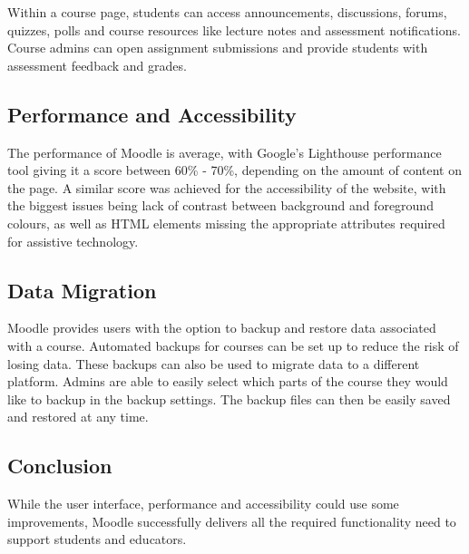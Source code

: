 Within a course page, students can access announcements, discussions, forums, quizzes, polls and course resources like lecture notes and assessment notifications.
Course admins can open assignment submissions and provide students with assessment feedback and grades.

\subsection{Performance and Accessibility}
The performance of Moodle is average, with Google's Lighthouse performance tool giving it a score between 60\% - 70\%, depending on the amount of content on the page.
A similar score was achieved for the accessibility of the website, with the biggest issues being lack of contrast between background and foreground colours, as well as HTML elements missing the appropriate attributes required for assistive technology.

\subsection{Data Migration}
Moodle provides users with the option to backup and restore data associated with a course.
Automated backups for courses can be set up to reduce the risk of losing data.
These backups can also be used to migrate data to a different platform.
Admins are able to easily select which parts of the course they would like to backup in the backup settings.
The backup files can then be easily saved and restored at any time.

\subsection{Conclusion}
While the user interface, performance and accessibility could use some improvements, Moodle successfully delivers all the required functionality need to support students and educators.